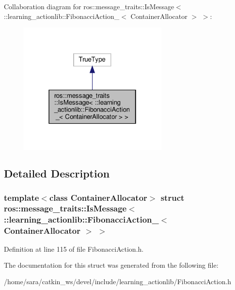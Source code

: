 Collaboration diagram for ros\+:\+:message\+\_\+traits\+:\+:Is\+Message$<$ \+:\+:learning\+\_\+actionlib\+:\+:Fibonacci\+Action\+\_\+$<$ Container\+Allocator $>$ $>$\+:
\nopagebreak
\begin{figure}[H]
\begin{center}
\leavevmode
\includegraphics[width=214pt]{structros_1_1message__traits_1_1IsMessage_3_01_1_1learning__actionlib_1_1FibonacciAction___3_01Cc8090b99bd23ef228b5f7bf0021e41f9}
\end{center}
\end{figure}


\subsection{Detailed Description}
\subsubsection*{template$<$class Container\+Allocator$>$\newline
struct ros\+::message\+\_\+traits\+::\+Is\+Message$<$ \+::learning\+\_\+actionlib\+::\+Fibonacci\+Action\+\_\+$<$ Container\+Allocator $>$ $>$}



Definition at line 115 of file Fibonacci\+Action.\+h.



The documentation for this struct was generated from the following file\+:\begin{DoxyCompactItemize}
\item 
/home/sara/catkin\+\_\+ws/devel/include/learning\+\_\+actionlib/Fibonacci\+Action.\+h\end{DoxyCompactItemize}
